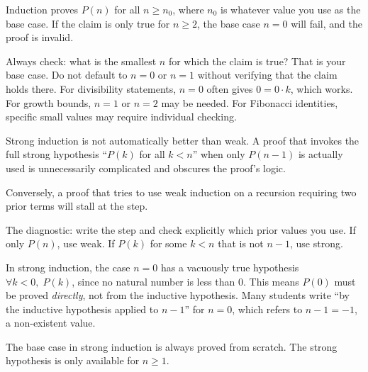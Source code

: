 \begin{remark}
Induction proves $P(n)$ for all $n \geq n_0$, where $n_0$ is whatever
value you use as the base case. If the claim is only true for $n \geq 2$,
the base case $n = 0$ will fail, and the proof is invalid.

Always check: what is the smallest $n$ for which the claim is true?
That is your base case. Do not default to $n = 0$ or $n = 1$ without
verifying that the claim holds there. For divisibility statements,
$n = 0$ often gives $0 = 0 \cdot k$, which works. For growth bounds,
$n = 1$ or $n = 2$ may be needed. For Fibonacci identities, specific
small values may require individual checking.
\end{remark}

\begin{remark}
Strong induction is not automatically better than weak. A proof that
invokes the full strong hypothesis ``$P(k)$ for all $k < n$'' when
only $P(n-1)$ is actually used is unnecessarily complicated and obscures
the proof's logic.

Conversely, a proof that tries to use weak induction on a recursion
requiring two prior terms will stall at the step.

The diagnostic: write the step and check explicitly which prior values
you use. If only $P(n)$, use weak. If $P(k)$ for some $k < n$ that
is not $n-1$, use strong.
\end{remark}

\begin{remark}
In strong induction, the case $n = 0$ has a vacuously true hypothesis
$\forall k < 0,\; P(k)$, since no natural number is less than $0$.
This means $P(0)$ must be proved \emph{directly}, not from the inductive
hypothesis. Many students write ``by the inductive hypothesis applied
to $n - 1$'' for $n = 0$, which refers to $n - 1 = -1$, a non-existent
value.

The base case in strong induction is always proved from scratch.
The strong hypothesis is only available for $n \geq 1$.
\end{remark}

